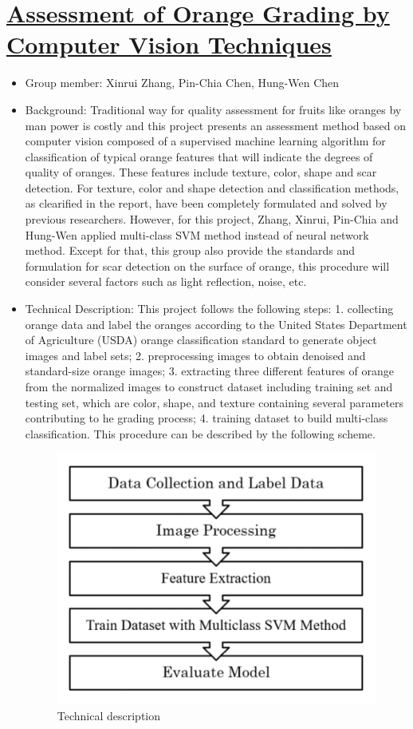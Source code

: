 \documentclass[letterpaper]{article}
\begin{document}
\section{\underline{Assessment of Orange Grading by Computer Vision Techniques}}
\begin{itemize}
	\item Group member: Xinrui Zhang, Pin-Chia Chen, Hung-Wen Chen
	\item Background: Traditional way for quality assessment for fruits like oranges by man power is costly and this project presents an assessment method based on computer vision composed of a supervised machine learning algorithm for classification of typical orange features that will indicate the degrees of quality of oranges. These features include texture, color, shape and scar detection. For texture, color and shape detection and classification methods, as clearified in the report, have been completely formulated and solved by previous researchers. However, for this project, Zhang, Xinrui, Pin-Chia and Hung-Wen applied multi-class SVM method instead of neural network method. Except for that, this group also provide the standards and formulation for scar detection on the surface of orange, this procedure will consider several factors such as light reflection, noise, etc.
	\item Technical Description: This project follows the following steps: 1. collecting orange data and label the oranges according to the United States Department of Agriculture (USDA) orange classification standard to generate object images and label sets; 2. preprocessing images to obtain denoised and standard-size orange images; 3. extracting three different features of orange from the normalized images to construct dataset including training set and testing set, which are color, shape, and texture containing several parameters contributing to he grading process; 4. training dataset to build multi-class classification. This procedure can be described by the following scheme.
	\begin{figure}[H]
	\centering
	\includegraphics[scale=0.3]{scheme.png}
	\caption{Technical description}
	\label{tech}
	\end{figure}
	

\end{itemize}
\end{document}
